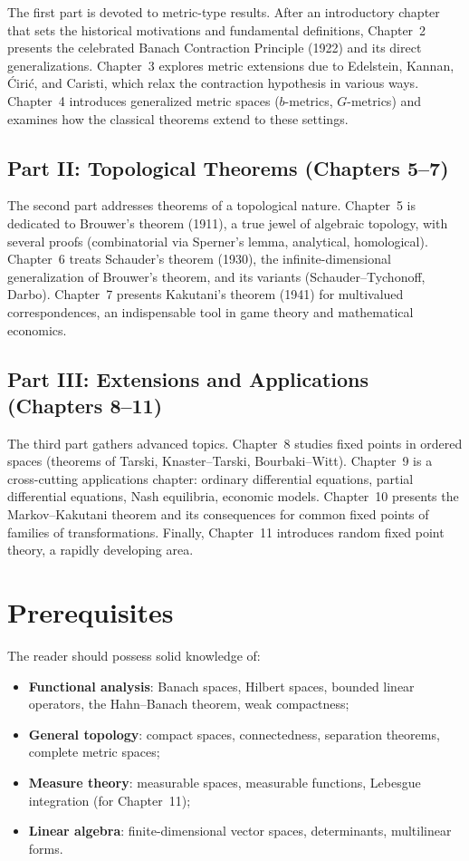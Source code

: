 The first part is devoted to metric-type results. After an introductory chapter
that sets the historical motivations and fundamental definitions, Chapter~2
presents the celebrated Banach Contraction Principle (1922) and its direct
generalizations. Chapter~3 explores metric extensions due to Edelstein, Kannan,
\'Ciri\'c, and Caristi, which relax the contraction hypothesis in various ways.
Chapter~4 introduces generalized metric spaces ($b$-metrics, $G$-metrics) and
examines how the classical theorems extend to these settings.

\subsection*{Part II: Topological Theorems (Chapters 5--7)}

The second part addresses theorems of a topological nature. Chapter~5 is
dedicated to Brouwer's theorem (1911), a true jewel of algebraic topology,
with several proofs (combinatorial via Sperner's lemma, analytical,
homological). Chapter~6 treats Schauder's theorem (1930), the
infinite-dimensional generalization of Brouwer's theorem, and its variants
(Schauder--Tychonoff, Darbo). Chapter~7 presents Kakutani's theorem (1941) for
multivalued correspondences, an indispensable tool in game theory and
mathematical economics.

\subsection*{Part III: Extensions and Applications (Chapters 8--11)}

The third part gathers advanced topics. Chapter~8 studies fixed points in
ordered spaces (theorems of Tarski, Knaster--Tarski, Bourbaki--Witt). Chapter~9
is a cross-cutting applications chapter: ordinary differential equations,
partial differential equations, Nash equilibria, economic models. Chapter~10
presents the Markov--Kakutani theorem and its consequences for common fixed
points of families of transformations. Finally, Chapter~11 introduces random
fixed point theory, a rapidly developing area.

\section*{Prerequisites}

The reader should possess solid knowledge of:
\begin{itemize}
    \item \textbf{Functional analysis}: Banach spaces, Hilbert spaces, bounded
          linear operators, the Hahn--Banach theorem, weak compactness;
    \item \textbf{General topology}: compact spaces, connectedness, separation
          theorems, complete metric spaces;
    \item \textbf{Measure theory}: measurable spaces, measurable functions,
          Lebesgue integration (for Chapter~11);
    \item \textbf{Linear algebra}: finite-dimensional vector spaces, determinants,
          multilinear forms.
\end{itemize}

